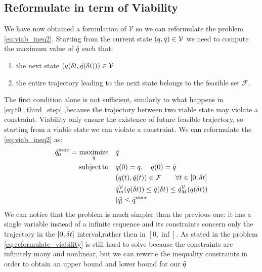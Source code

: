 \documentclass{article}
\begin{document}
\subsection{Reformulate in term of Viability}
We have now obtained a formulation of $\mathcal{V}$ so we can reformulate the problem \ref{eq:viab_ineq2}. Starting from the current state $(q,\dot{q}) \in \mathcal{V}$ we need to compute the maximum value of $\ddot{q}$ such that:
\begin{enumerate}
    \item the next state $(q(\delta t,\dot{q}(\delta t)))\in \mathcal{V}$
    \item the entire trajectory leading to the next state belongs to the feasible set $\mathcal{F}$.
\end{enumerate}
The first condition alone is not sufficient, similarly to what happens in \ref{eq:t0_third_step} ,because the trajectory between two viable state may violate a constraint. Viability only ensure the existence of future feasible trajectory, so starting from a viable state we can violate a constraint. We can reformulate the \ref{eq:viab_ineq2} as:
\begin{equation} \label{eq:problem_ref_viab} \begin{aligned} 
    \ddot{q}_0^{max} = \operatorname*{maximize}_{\ddot{q}} \quad & \ddot{q} \\
    \operatorname*{subject\,to} \quad & q(0) = q, \quad \dot{q}(0) = \dot{q} \\
    & (q(t), \dot{q}(t)) \in \mathcal{F}	\qquad	 \forall t \in [0, \delta t] \\
    & \dot{q}^{\mathcal{V}}_m(q(\delta t)) \le \dot{q}(\delta t) \le \dot{q}^{\mathcal{V}}_M(q(\delta t)) \\
    & |\ddot{q}| \le \ddot{q}^{max}
    \label{eq:reformulate_viability}
    \end{aligned} 
\end{equation}
We can notice that the problem is much simpler than the previous one: it has a single variable instead of a infinite sequence and its constraints concern only the trajectory in the $[0,\delta t]$ interval,rather then in $[0,\inf]$. As stated in \cite{DelPrete2018} the problem \ref{eq:reformulate_viability} is still hard to solve because the constraints are infinitely many and nonlinear, but we can rewrite the inequality constraints in order to obtain an upper bound and lower bound for our $\ddot{q}$
\end{document}

